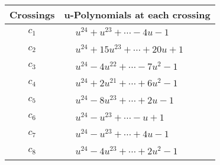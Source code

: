 \documentclass[1p]{elsarticle_modified}
\theoremstyle{definition}
\begin{document}
\begin{tabular}{m{50pt}|m{274pt}}
Crossings & \hspace{64pt}u-Polynomials at each crossing \\
\hline $$\begin{aligned}c_{1}\end{aligned}$$&$\begin{aligned}
&u^{24}+u^{23}+\cdots-4 u-1
\end{aligned}$\\
\hline $$\begin{aligned}c_{2}\end{aligned}$$&$\begin{aligned}
&u^{24}+15 u^{23}+\cdots+20 u+1
\end{aligned}$\\
\hline $$\begin{aligned}c_{3}\end{aligned}$$&$\begin{aligned}
&u^{24}-4 u^{22}+\cdots-7 u^2-1
\end{aligned}$\\
\hline $$\begin{aligned}c_{4}\end{aligned}$$&$\begin{aligned}
&u^{24}+2 u^{21}+\cdots+6 u^2-1
\end{aligned}$\\
\hline $$\begin{aligned}c_{5}\end{aligned}$$&$\begin{aligned}
&u^{24}-8 u^{23}+\cdots+2 u-1
\end{aligned}$\\
\hline $$\begin{aligned}c_{6}\end{aligned}$$&$\begin{aligned}
&u^{24}- u^{23}+\cdots- u+1
\end{aligned}$\\
\hline $$\begin{aligned}c_{7}\end{aligned}$$&$\begin{aligned}
&u^{24}- u^{23}+\cdots+4 u-1
\end{aligned}$\\
\hline $$\begin{aligned}c_{8}\end{aligned}$$&$\begin{aligned}
&u^{24}-4 u^{23}+\cdots+2 u^2-1
\end{aligned}$\\

\end{tabular}
\end{document}
